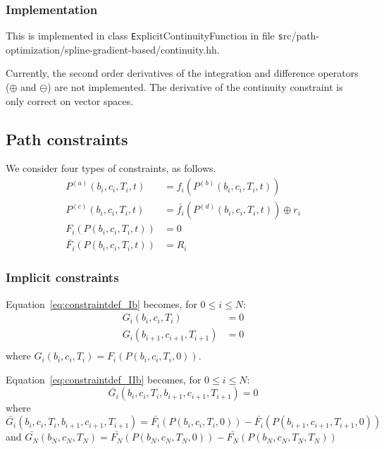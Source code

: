 \documentclass {article}
\newcommand\spline[4]{P(#1, #2, #3, #4)}
\newcommand\splinea[2]{\spline{b_{#1}}{c_{#1}}{T_{#1}}{#2}}
\newcommand\subspline[5]{P^{#1}(#2, #3, #4, #5)}
\newcommand\subsplinea[3]{\subspline{#1}{b_{#2}}{c_{#2}}{T_{#2}}{#3}}
\begin{document}
\subsubsection{Implementation}
This is implemented in class {\texttt ExplicitContinuityFunction}
in file {\texttt src/path-optimization/spline-gradient-based/continuity.hh}.

Currently, the second order derivatives of the integration and difference operators
($\oplus$ and $\ominus$) are not implemented. The derivative of the continuity constraint is
only correct on vector spaces.

\subsection{Path constraints}

We consider four types of constraints, as follows.
\begin{align}
     \subsplinea{(a)}{i}{t} &= f_i (\subsplinea{(b)}{i}{t}) \label{eq:constraintdef_Ia}
  \\ \subsplinea{(c)}{i}{t} &= \bar{f_i} (\subsplinea{(d)}{i}{t}) \oplus r_i \label{eq:constraintdef_IIa}
  \\      F_i  (\splinea{i}{t}) &= 0   \label{eq:constraintdef_Ib}
  \\ \bar{F_i} (\splinea{i}{t}) &= R_i \label{eq:constraintdef_IIb}
\end{align}

\subsubsection{Implicit constraints}
Equation~\eqref{eq:constraintdef_Ib} becomes, for $0\le i\le N$:
\begin{align*}
  G_i(b_i, c_i, T_i) &= 0 \\
  G_i(b_{i+1}, c_{i+1}, T_{i+1}) &= 0 \\
\end{align*}
where $G_i(b_i, c_i, T_i) = F_i  (\splinea{i}{0})$.

Equation~\eqref{eq:constraintdef_IIb} becomes, for $0\le i\le N$:
\begin{equation*}
  \bar{G_i}(b_i, c_i, T_i, b_{i+1}, c_{i+1}, T_{i+1}) = 0
\end{equation*}
where $
\bar{G_i}(b_i, c_i, T_i, b_{i+1}, c_{i+1}, T_{i+1}) =
\bar{F_i} (\splinea{i}{0}) - \bar{F_i} (\splinea{i+1}{0})
$
and 
$
\bar{G_N}(b_N, c_N, T_N) =
\bar{F_N} (\splinea{N}{0}) - \bar{F_N} (\splinea{N}{T_N})
$
\end{document}

